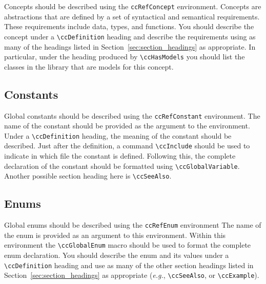 Concepts should be described using the {\tt ccRefConcept} environment.%
Concepts are abstractions that are defined by a set of syntactical and
semantical requirements.  These requirements include data, types, and functions.
You should describe the concept under a \verb|\ccDefinition|
heading and describe the requirements using as many of the headings listed
in Section~\ref{sec:section_headings} as appropriate.  In particular, under
the heading produced by  \verb|\ccHasModels| you should list  the classes
in the library that are models for this concept.

\subsection{Constants}
\label{sec:ref_constant}

Global constants should be described using the 
{\tt ccRefConstant} environment.%
The name of the constant
should be provided as the argument to the environment.  Under a
\verb|\ccDefinition| heading, the meaning of the constant
should be described.  Just after the definition, a command 
\verb|\ccInclude| should be used to indicate in which file the constant
is defined.  Following this, the complete declaration of the constant
should be formatted using \verb|\ccGlobalVariable|.
Another possible section heading here is \verb|\ccSeeAlso|.

\subsection{Enums}
\label{sec:ref_enums}

Global enums should be described using the {\tt ccRefEnum} environment%
The name of the enum is provided as an argument to this environment.
Within this environment the \verb|\ccGlobalEnum| macro should be used to
format the complete enum declaration.  You should describe the enum and
its values under a \verb|\ccDefinition| heading and use as many of the 
other section headings listed in Section~\ref{sec:section_headings} as 
appropriate ({\em e.g.}, \verb|\ccSeeAlso|, or \verb|\ccExample|).

